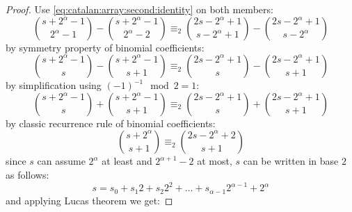 \begin{proof}
    Use \autoref{eq:catalan:array:second:identity} on both members:
    \begin{displaymath}
        {{s+2^{\alpha}-1}\choose{2^{\alpha}-1}}- {{s+2^{\alpha}-1}\choose{2^{\alpha}-2}} \equiv_{2}
        {{2s-2^{\alpha}+1}\choose{s-2^{\alpha}+1}}- {{2s-2^{\alpha}+1}\choose{s-2^{\alpha}}}
    \end{displaymath}
    by symmetry property of binomial coefficients:
    \begin{displaymath}
        {{s+2^{\alpha}-1}\choose{s}}- {{s+2^{\alpha}-1}\choose{s+1}} \equiv_{2}
        {{2s-2^{\alpha}+1}\choose{s}}- {{2s-2^{\alpha}+1}\choose{s+1}}
    \end{displaymath}
    by simplification using $(-1)^{-1}\mod 2=1$: 
    \begin{displaymath}
        {{s+2^{\alpha}-1}\choose{s}}+ {{s+2^{\alpha}-1}\choose{s+1}} \equiv_{2}
        {{2s-2^{\alpha}+1}\choose{s}}+ {{2s-2^{\alpha}+1}\choose{s+1}}
    \end{displaymath}
    by classic recurrence rule of binomial coefficients:
    \begin{displaymath}
        {{s+2^{\alpha}}\choose{s+1}} \equiv_{2} {{2s-2^{\alpha}+2}\choose{s+1}}
    \end{displaymath}
    since $s$ can assume $2^{\alpha}$ at least and $2^{\alpha+1}-2$ at most, 
    $s$ can be written in base $2$ as follows:
    \begin{displaymath}
        s=s_{0} + s_{1}2 + s_{2}2^{2}+\ldots+s_{\alpha-1}2^{\alpha-1}+2^{\alpha}
    \end{displaymath}
    and applying Lucas theorem we get:


\end{proof}
